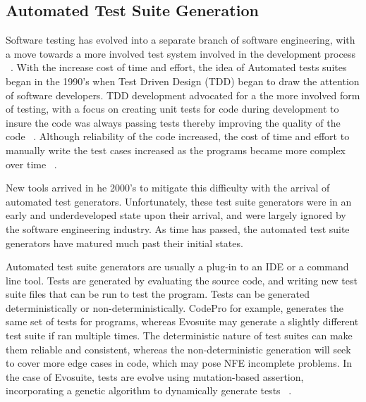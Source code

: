 \documentclass[conference]{IEEEtran}
\begin{document}
\subsection{Automated Test Suite Generation}
Software testing has evolved into a separate branch of software engineering, with a move towards a more involved test system involved in the development process ~\cite{Gelperin:1988:GST:62959.62965}. With the increase cost of time and effort, the idea of Automated tests suites began in the 1990's when Test Driven Design (TDD) began to draw the attention of software developers. TDD development advocated for a the more involved form of testing, with a focus on creating unit tests for code during development to insure the code was always passing tests thereby improving the quality of the code ~\cite{Canfora:2006:EAT:1159733.1159788}.  Although reliability of the code increased, the cost of time and effort to manually write the test cases increased as the programs became more complex over time ~\cite{clarke1998automated}. 

New tools arrived in he 2000's to mitigate this difficulty with the arrival of automated test generators. Unfortunately, these test suite generators were in an early and underdeveloped state upon their arrival, and were largely ignored by the software engineering industry. As time has passed, the automated test suite generators have matured much past their initial states.

Automated test suite generators are usually a plug-in to an IDE or a command line tool. Tests are generated by evaluating the source code, and writing new test suite files that can be run to test the program.  Tests can be generated deterministically or non-deterministically. CodePro for example, generates the same set of tests for programs, whereas Evosuite may generate a slightly different test suite if ran multiple times. The deterministic nature of test suites can make them reliable and consistent, whereas the non-deterministic generation will seek to cover more edge cases in code, which may pose NFE incomplete problems. In the case of Evosuite, tests are evolve using mutation-based assertion, incorporating a genetic algorithm to dynamically generate tests ~\cite{Fraser:2011:EAT:2025113.2025179}. 

\end{document}
